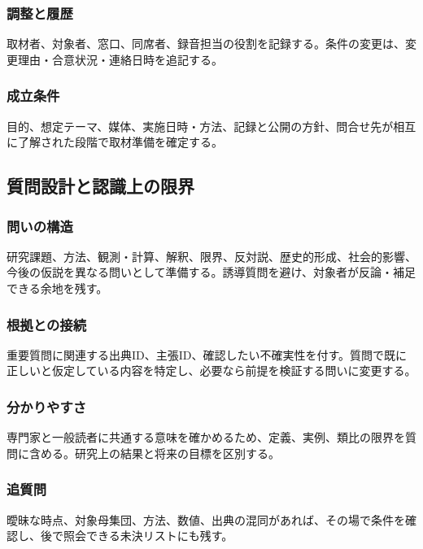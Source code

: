 \documentclass[a4paper,11pt]{article}
\begin{document}
\subsubsection{調整と履歴}
\par 取材者、対象者、窓口、同席者、録音担当の役割を記録する。条件の変更は、変更理由・合意状況・連絡日時を追記する。\par\medskip
\subsubsection{成立条件}
\par 目的、想定テーマ、媒体、実施日時・方法、記録と公開の方針、問合せ先が相互に了解された段階で取材準備を確定する。\par\medskip
\subsection{質問設計と認識上の限界}
\subsubsection{問いの構造}
\par 研究課題、方法、観測・計算、解釈、限界、反対説、歴史的形成、社会的影響、今後の仮説を異なる問いとして準備する。誘導質問を避け、対象者が反論・補足できる余地を残す。\par\medskip
\subsubsection{根拠との接続}
\par 重要質問に関連する出典ID、主張ID、確認したい不確実性を付す。質問で既に正しいと仮定している内容を特定し、必要なら前提を検証する問いに変更する。\par\medskip
\subsubsection{分かりやすさ}
\par 専門家と一般読者に共通する意味を確かめるため、定義、実例、類比の限界を質問に含める。研究上の結果と将来の目標を区別する。\par\medskip
\subsubsection{追質問}
\par 曖昧な時点、対象母集団、方法、数値、出典の混同があれば、その場で条件を確認し、後で照会できる未決リストにも残す。\par\medskip
\end{document}
